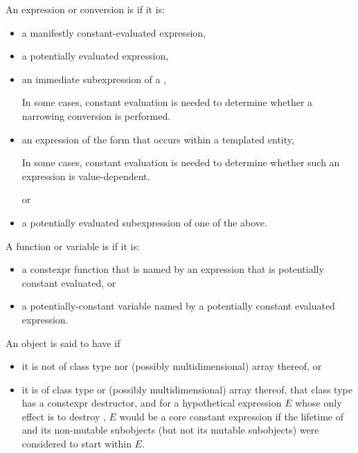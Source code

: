 \pnum
{}%
An expression or conversion is 
if it is:
\begin{itemize}
\item
a manifestly constant-evaluated expression,

\item
a potentially evaluated expression,

\item
an immediate subexpression of a ,
\begin{footnote}
In some cases, constant evaluation is needed to determine whether a narrowing conversion is performed.
\end{footnote}

\item
an expression of the form \tcode{\&} 
that occurs within a templated entity,
\begin{footnote}
In some cases, constant evaluation is needed to determine whether such an expression is value-dependent.
\end{footnote}
or

\item
a potentially evaluated subexpression of one of the above.
\end{itemize}

%
%
A function or variable is
if it is:
\begin{itemize}
\item
a constexpr function that is named by an expression
that is potentially constant evaluated, or

\item
a potentially-constant variable named by a potentially constant evaluated expression.
\end{itemize}

\pnum
An object  is said to have  if
\begin{itemize}
\item
  it is not of class type nor (possibly multidimensional) array thereof, or
\item
  it is of class type or (possibly multidimensional) array thereof,
  that class type has a constexpr destructor, and
  for a hypothetical expression $E$
  whose only effect is to destroy ,
  $E$ would be a core constant expression
  if the lifetime of  and its non-mutable subobjects
  (but not its mutable subobjects) were considered to start within $E$.
\end{itemize}

